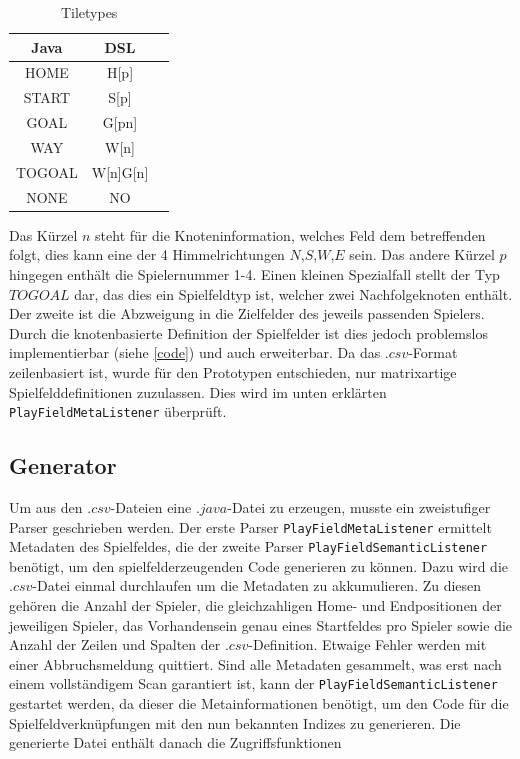 \documentclass[conference]{IEEEtran}
\begin{document}
\begin{table}[h!]
  \centering
  \caption{Tiletypes}
  \label{tab:table1}
  \begin{tabular}{ccc}
    \toprule
    Java & DSL\\
    \midrule
    HOME & H[p]\\
    START & S[p]\\
    GOAL & G[pn] \\
    WAY & W[n] \\
    TOGOAL & W[n]G[n] \\
    NONE & NO \\
    \bottomrule
  \end{tabular}
\end{table}

Das K\"urzel $n$ steht f\"ur die Knoteninformation, welches Feld dem betreffenden folgt, dies kann eine der 4 Himmelrichtungen $N$,$S$,$W$,$E$ sein. Das andere K\"urzel $p$ hingegen enth\"alt die Spielernummer 1-4. Einen kleinen Spezialfall stellt der Typ $TOGOAL$ dar, das dies ein Spielfeldtyp ist, welcher zwei Nachfolgeknoten enth\"alt. Der zweite ist die Abzweigung in die Zielfelder des jeweils passenden Spielers. Durch die knotenbasierte Definition
der Spielfelder ist dies jedoch problemslos implementierbar (siehe \ref{code}) und auch erweiterbar.
Da das $.csv$-Format zeilenbasiert ist, wurde f\"ur den Prototypen entschieden, nur matrixartige Spielfelddefinitionen zuzulassen. Dies wird im unten erkl\"arten \texttt{PlayFieldMetaListener} \"uberpr\"uft.

\subsection{Generator}

Um aus den $.csv$-Dateien eine $.java$-Datei zu erzeugen, musste ein zweistufiger Parser geschrieben werden. Der erste Parser \texttt{PlayFieldMetaListener} ermittelt Metadaten des Spielfeldes, die der zweite Parser \texttt{PlayFieldSemanticListener} ben\"otigt, um den spielfelderzeugenden Code generieren zu k\"onnen. Dazu wird die $.csv$-Datei einmal durchlaufen um die Metadaten zu akkumulieren. Zu diesen gehören die Anzahl der Spieler, die gleichzahligen Home- und Endpositionen der jeweiligen Spieler, das Vorhandensein genau eines Startfeldes pro Spieler sowie die Anzahl der Zeilen und Spalten der $.csv$-Definition. Etwaige Fehler werden mit einer Abbruchsmeldung quittiert. Sind alle Metadaten gesammelt, was erst nach einem vollständigem Scan garantiert ist, kann der \texttt{PlayFieldSemanticListener} gestartet werden, da dieser die Metainformationen benötigt, um den Code für die Spielfeldverknüpfungen mit den nun bekannten Indizes zu generieren.
Die generierte Datei enthält danach die Zugriffsfunktionen 
\end{document}
